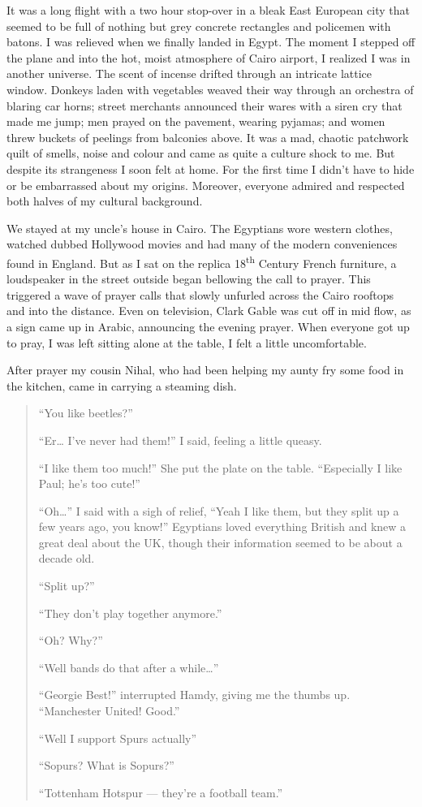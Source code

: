 \documentclass[12pt]{memoir}
\let \Sup=\textsuperscript
\begin{document}
It was a long flight with a two hour stop-over
in a bleak East European city that seemed to be full of nothing
but grey concrete rectangles and policemen with batons.
I was relieved when we finally landed in Egypt.
The moment I stepped off the plane and into the hot,
moist atmosphere of Cairo airport,
I realized I was in another universe.
The scent of incense drifted through an intricate lattice window.
Donkeys laden with vegetables weaved their way
through an orchestra of blaring car horns;
street merchants announced their wares with a siren cry that made me jump;
men prayed on the pavement, wearing pyjamas;
and women threw buckets of peelings from balconies above.
It was a mad, chaotic patchwork quilt of smells,
noise and colour and came as quite a culture shock to me.
But despite its strangeness I soon felt at home.
For the first time I didn’t have to hide or be embarrassed about my origins.
Moreover, everyone admired and respected both halves of my cultural background.


We stayed at my uncle’s house in Cairo.
The Egyptians wore western clothes,
watched dubbed Hollywood movies
and had many of the modern conveniences found in England.
But as I sat on the replica 18\Sup{th} Century French furniture,
a loudspeaker in the street outside began bellowing the call to prayer.
This triggered a wave of prayer calls
that slowly unfurled across the Cairo rooftops and into the distance.
Even on television, Clark Gable was cut off in mid flow,
as a sign came up in Arabic, announcing the evening prayer.
When everyone got up to pray,
I was left sitting alone at the table,
I felt a little uncomfortable.

After prayer my cousin Nihal,
who had been helping my aunty fry some food in the kitchen,
came in carrying a steaming dish.

\begin{quote}
“You like beetles?”

“Er… I’ve never had them!” I said, feeling a little queasy.

“I like them too much!”
She put the plate on the table.
“Especially I like Paul; he’s too cute!”

“Oh…” I said with a sigh of relief,
“Yeah I like them, but they split up a few years ago, you know!”
Egyptians loved everything British and knew a great deal about the UK,
though their information seemed to be about a decade old.

“Split up?”

“They don’t play together anymore.”

“Oh? Why?”

“Well bands do that after a while…”

“Georgie Best!” interrupted Hamdy, giving me the thumbs up.
“Manchester United! Good.”

“Well I support Spurs actually”

“Sopurs? What is Sopurs?”

“Tottenham Hotspur — they’re a football team.”
\end{quote}
\end{document}
